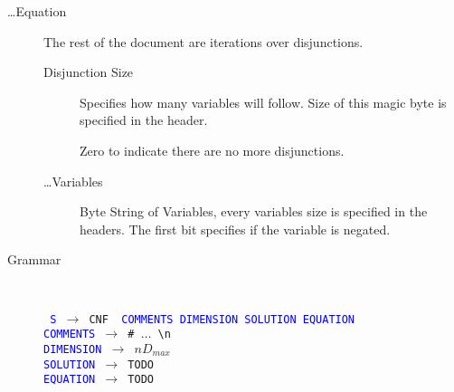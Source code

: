 \documentclass[12pt, letterpaper]{article}
\begin{document}
\begin{description}
\begin{description}
		\end{description}
        

		\item[\ldots Equation]
		
		The rest of the document are iterations over
		disjunctions.

		\begin{description}
			\item[Disjunction Size]
			
			Specifies how many variables will
			follow. Size of this magic byte is
			specified in the header.

			Zero to indicate there are no more
			disjunctions.

			\item[\ldots Variables]
			
			Byte String of Variables, every
			variables size is specified in the
			headers. The first bit specifies if
			the variable is negated.

		\end{description}

        \item[Grammar]
        
		{\ }

		\texttt {
			\textcolor{blue}{S} $\rightarrow$ \colorbox{blue!15}{CNF\ } \textcolor{blue}{COMMENTS} \textcolor{blue}{DIMENSION} \textcolor{blue}{SOLUTION} \textcolor{blue}{EQUATION} \\
			\textcolor{blue}{COMMENTS} $\rightarrow$ \colorbox{blue!15}{\#} $\dots$ \textbackslash n \\
			\textcolor{blue}{DIMENSION} $\rightarrow$ $n$$D_{max}$ \\
			\textcolor{blue}{SOLUTION} $\rightarrow$ TODO \\
			\textcolor{blue}{EQUATION} $\rightarrow$ TODO \\
		}
    \end{description}
\end{document}
